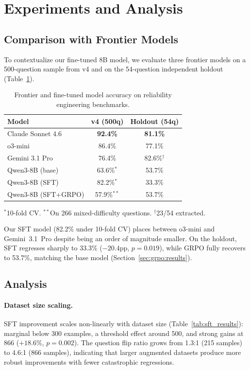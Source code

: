 \section{Experiments and Analysis}
\label{sec:experiments}

\subsection{Comparison with Frontier Models}
\label{sec:exp:baselines}

To contextualize our fine-tuned 8B model, we evaluate three frontier models on a 500-question sample from v4 and on the 54-question independent holdout (Table~\ref{tab:baselines}).

\begin{table}[t]
\centering
\small
\caption{Frontier and fine-tuned model accuracy on reliability engineering benchmarks.}
\label{tab:baselines}
\begin{tabular}{@{}lcc@{}}
\toprule
Model & v4 (500q) & Holdout (54q) \\
\midrule
Claude Sonnet 4.6      & \textbf{92.4\%} & \textbf{81.1\%} \\
o3-mini                & 86.4\% & 77.1\% \\
Gemini 3.1 Pro         & 76.4\% & 82.6\%$^\dagger$ \\
\midrule
Qwen3-8B (base)        & 63.6\%$^*$ & 53.7\% \\
Qwen3-8B (SFT)         & 82.2\%$^*$ & 33.3\% \\
Qwen3-8B (SFT+GRPO)   & 57.9\%$^{**}$ & 53.7\% \\
\bottomrule
\end{tabular}
\vspace{0.1em}

{\scriptsize $^*$10-fold CV. $^{**}$On 266 mixed-difficulty questions. $^\dagger$23/54 extracted.}
\end{table}

Our SFT model (82.2\% under 10-fold CV) places between o3-mini and Gemini~3.1~Pro despite being an order of magnitude smaller. On the holdout, SFT regresses sharply to 33.3\% ($-20.4$pp, $p=0.019$), while GRPO fully recovers to 53.7\%, matching the base model (Section~\ref{sec:grpo:results}).

\subsection{Analysis}
\label{sec:exp:analysis}

\paragraph{Dataset size scaling.} SFT improvement scales non-linearly with dataset size (Table~\ref{tab:sft_results}): marginal below 300 examples, a threshold effect around 500, and strong gains at 866 ($+18.6\%$, $p=0.002$). The question flip ratio grows from 1.3:1 (215 samples) to 4.6:1 (866 samples), indicating that larger augmented datasets produce more robust improvements with fewer catastrophic regressions.

